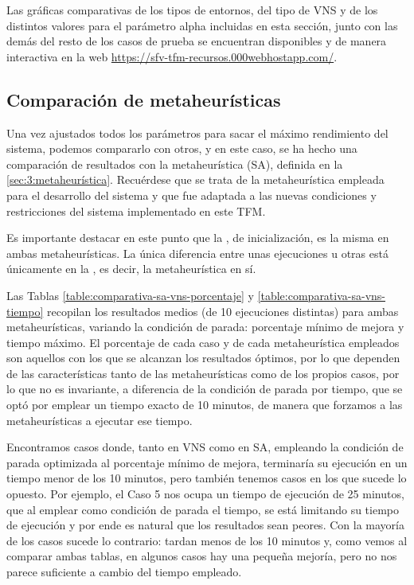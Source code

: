Las gráficas comparativas de los tipos de entornos, del tipo de VNS y de los distintos valores para el parámetro alpha incluidas en esta sección, junto con las demás del resto de los casos de prueba se encuentran disponibles y de manera interactiva en la web \url{https://sfv-tfm-recursos.000webhostapp.com/}.

\subsection{Comparación de metaheurísticas}
\label{sec:5:comparacion-metaheuristicas}

Una vez ajustados todos los parámetros para sacar el máximo rendimiento del sistema, podemos compararlo con otros, y en este caso, se ha hecho una comparación de resultados con la metaheurística \sa{} (SA), definida en la \autoref{sec:3:metaheurística}. Recuérdese que se trata de la metaheurística empleada para el desarrollo del sistema \legacy{} y que fue adaptada a las nuevas condiciones y restricciones del sistema implementado en este TFM.

Es importante destacar en este punto que la \faseuno{}, de inicialización, es la misma en ambas metaheurísticas. La única diferencia entre unas ejecuciones u otras está únicamente en la \fasedos{}, es decir, la metaheurística en sí.

Las Tablas \ref{table:comparativa-sa-vns-porcentaje} y \ref{table:comparativa-sa-vns-tiempo} recopilan los resultados medios (de 10 ejecuciones distintas) para ambas metaheurísticas, variando la condición de parada: porcentaje mínimo de mejora y tiempo máximo. El porcentaje de cada caso y de cada metaheurística empleados son aquellos con los que se alcanzan los resultados óptimos, por lo que dependen de las características tanto de las metaheurísticas como de los propios casos, por lo que no es invariante, a diferencia de la condición de parada por tiempo, que se optó por emplear un tiempo exacto de 10 minutos, de manera que forzamos a las metaheurísticas a ejecutar ese tiempo. 

Encontramos casos donde, tanto en VNS como en SA, empleando la condición de parada optimizada al porcentaje mínimo de mejora, terminaría su ejecución en un tiempo menor de los 10 minutos, pero también tenemos casos en los que sucede lo opuesto. Por ejemplo, el Caso 5 nos ocupa un tiempo de ejecución de 25 minutos, que al emplear como condición de parada el tiempo, se está limitando su tiempo de ejecución y por ende es natural que los resultados sean peores. Con la mayoría de los casos sucede lo contrario: tardan menos de los 10 minutos y, como vemos al comparar ambas tablas, en algunos casos hay una pequeña mejoría, pero no nos parece suficiente a cambio del tiempo empleado.


